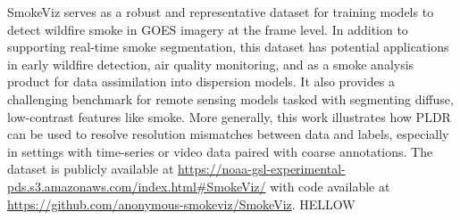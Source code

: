 \documentclass{article}
\begin{document}
SmokeViz serves as a robust and representative dataset for training models to detect wildfire smoke in GOES imagery at the frame level. In addition to supporting real-time smoke segmentation, this dataset has potential applications in early wildfire detection, air quality monitoring, and as a smoke analysis product for data assimilation into dispersion models. It also provides a challenging benchmark for remote sensing models tasked with segmenting diffuse, low-contrast features like smoke. More generally, this work illustrates how PLDR can be used to resolve resolution mismatches between data and labels, especially in settings with time-series or video data paired with coarse annotations. The dataset is publicly available at \url{https://noaa-gsl-experimental-pds.s3.amazonaws.com/index.html#SmokeViz/} with code available at \url{https://github.com/anonymous-smokeviz/SmokeViz}. 
HELLOW




\end{document}
